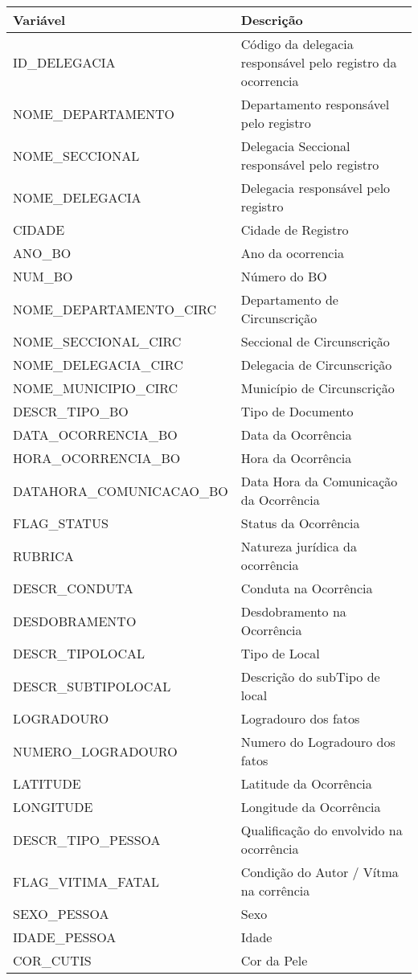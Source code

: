\documentclass[
  12pt,
  portuguese,
]{report}
\begin{document}
\begin{tabular}{l|l}
\hline
Variável & Descrição\\
\hline
ID\_DELEGACIA & Código da delegacia responsável pelo registro da ocorrencia\\
\hline
NOME\_DEPARTAMENTO & Departamento responsável pelo registro\\
\hline
NOME\_SECCIONAL & Delegacia Seccional responsável pelo registro\\
\hline
NOME\_DELEGACIA & Delegacia responsável pelo registro\\
\hline
CIDADE & Cidade de Registro\\
\hline
ANO\_BO & Ano da ocorrencia\\
\hline
NUM\_BO & Número do BO\\
\hline
NOME\_DEPARTAMENTO\_CIRC & Departamento de Circunscrição\\
\hline
NOME\_SECCIONAL\_CIRC & Seccional de Circunscrição\\
\hline
NOME\_DELEGACIA\_CIRC & Delegacia de Circunscrição\\
\hline
NOME\_MUNICIPIO\_CIRC & Município de Circunscrição\\
\hline
DESCR\_TIPO\_BO & Tipo de Documento\\
\hline
DATA\_OCORRENCIA\_BO & Data da Ocorrência\\
\hline
HORA\_OCORRENCIA\_BO & Hora da Ocorrência\\
\hline
DATAHORA\_COMUNICACAO\_BO & Data Hora da Comunicação da Ocorrência\\
\hline
FLAG\_STATUS & Status da Ocorrência\\
\hline
RUBRICA & Natureza jurídica da ocorrência\\
\hline
DESCR\_CONDUTA & Conduta na Ocorrência\\
\hline
DESDOBRAMENTO & Desdobramento na Ocorrência\\
\hline
DESCR\_TIPOLOCAL & Tipo de Local\\
\hline
DESCR\_SUBTIPOLOCAL & Descrição do subTipo de local\\
\hline
LOGRADOURO & Logradouro dos fatos\\
\hline
NUMERO\_LOGRADOURO & Numero do Logradouro dos fatos\\
\hline
LATITUDE & Latitude da Ocorrência\\
\hline
LONGITUDE & Longitude da Ocorrência\\
\hline
DESCR\_TIPO\_PESSOA & Qualificação do envolvido na ocorrência\\
\hline
FLAG\_VITIMA\_FATAL & Condição do Autor / Vítma na corrência\\
\hline
SEXO\_PESSOA & Sexo\\
\hline
IDADE\_PESSOA & Idade\\
\hline
COR\_CUTIS & Cor da Pele\\
\hline
\end{tabular}
\end{document}
